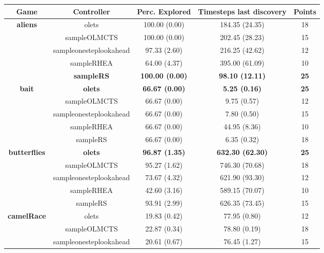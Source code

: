 \begin{table*}[!t]
\begin{center}
\begin{adjustbox}{width=1\textwidth}\begin{tabular}{|c|c|c|c|c|}
\hline
\textbf{Game} & \textbf{Controller} & \textbf{Perc. Explored} &  \textbf{Timesteps last discovery} & \textbf{Points}\\
\hline
\hline
\cline{2-5}
\multirow{5}{*}{\textbf{aliens}} & olets & 100.00 (0.00) & 184.35 (24.35) & 18
 \\
\cline{2-5}
 & sampleOLMCTS & 100.00 (0.00) & 202.45 (28.23) & 15
 \\
\cline{2-5}
 & sampleonesteplookahead & 97.33 (2.60) & 216.25 (42.62) & 12
 \\
\cline{2-5}
 & sampleRHEA & 64.00 (4.37) & 395.00 (61.09) & 10
 \\
\cline{2-5}
 & \textbf{sampleRS} & \textbf{100.00 (0.00)} & \textbf{98.10 (12.11)} & \textbf{25}
 \\
\hline
\hline
\cline{2-5}
\multirow{5}{*}{\textbf{bait}} & \textbf{olets} & \textbf{66.67 (0.00)} & \textbf{5.25 (0.16)} & \textbf{25}
 \\
\cline{2-5}
 & sampleOLMCTS & 66.67 (0.00) & 9.75 (0.57) & 12
 \\
\cline{2-5}
 & sampleonesteplookahead & 66.67 (0.00) & 7.80 (0.50) & 15
 \\
\cline{2-5}
 & sampleRHEA & 66.67 (0.00) & 44.95 (8.36) & 10
 \\
\cline{2-5}
 & sampleRS & 66.67 (0.00) & 6.35 (0.32) & 18
 \\
\hline
\hline
\cline{2-5}
\multirow{5}{*}{\textbf{butterflies}} & \textbf{olets} & \textbf{96.87 (1.35)} & \textbf{632.30 (62.30)} & \textbf{25}
 \\
\cline{2-5}
 & sampleOLMCTS & 95.27 (1.62) & 746.30 (70.68) & 18
 \\
\cline{2-5}
 & sampleonesteplookahead & 73.67 (4.32) & 621.90 (93.30) & 12
 \\
\cline{2-5}
 & sampleRHEA & 42.60 (3.16) & 589.15 (70.07) & 10
 \\
\cline{2-5}
 & sampleRS & 93.91 (2.99) & 626.35 (73.45) & 15
 \\
\hline
\hline
\cline{2-5}
\multirow{5}{*}{\textbf{camelRace}} & olets & 19.83 (0.42) & 77.95 (0.80) & 12
 \\
\cline{2-5}
 & sampleOLMCTS & 22.87 (0.34) & 78.80 (0.19) & 18
 \\
\cline{2-5}
 & sampleonesteplookahead & 20.61 (0.67) & 76.45 (1.27) & 15

\end{tabular}
\end{adjustbox}
\end{center}
\end{table*}
